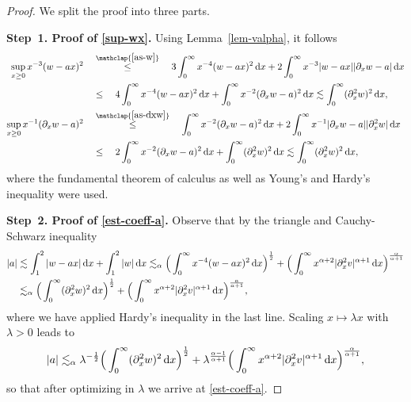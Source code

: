 \documentclass[reqno,12pt]{amsart}
\renewcommand{\d}{\ensuremath{\mathrm{d}}}
\renewcommand{\d}{\ensuremath{{\rm d}}}
\numberwithin{equation}{section}
\begin{document}
%
\begin{proof}
We split the proof into three parts.

%
\bigskip
%

\noindent\textbf{Step~1. Proof of \eqref{sup-wx}.}
Using Lemma~\ref{lem-valpha}, it follows
%
\begin{align*}
\sup_{x \ge 0} x^{-3} (w-ax)^2 \quad &\stackrel{\mathclap{\eqref{as-w}}}{\le} \quad 3 \int_0^\infty x^{-4} (w-ax)^2 \, \d x + 2 \int_0^\infty x^{-3} |w-ax| |\partial_x w - a| \, \d x \\
&\le \quad 4 \int_0^\infty x^{-4} (w-ax)^2 \, \d x + \int_0^\infty x^{-2} (\partial_x w - a)^2 \, \d x \lesssim \int_0^\infty (\partial_x^2 w)^2 \, \d x, \\
\sup_{x \ge 0} x^{-1} (\partial_x w - a)^2 \quad &\stackrel{\mathclap{\eqref{as-dxw}}}{\le} \quad \int_0^\infty x^{-2} (\partial_x w - a)^2 \, \d x + 2 \int_0^\infty x^{-1} |\partial_x w - a| |\partial_x^2 w| \, \d x \\
&\le \quad 2 \int_0^\infty x^{-2} (\partial_x w - a)^2 \, \d x + \int_0^\infty (\partial_x^2 w)^2 \, \d x \lesssim \int_0^\infty (\partial_x^2 w)^2 \, \d x,
\end{align*}
%
where the fundamental theorem of calculus as well as Young's and Hardy's inequality were used.

%
\bigskip
%

\noindent\textbf{Step~2. Proof of \eqref{est-coeff-a}.}
Observe that by the triangle and Cauchy-Schwarz inequality
%
\begin{align*}
|a| &\lesssim \int_1^2 |w - a x| \, \d x + \int_1^2 |w| \, \d x \lesssim_{\alpha}  \Big(\int_0^\infty x^{-4} (w-ax)^2 \, \d x\Big)^{\frac 1 2} + \Big(\int_0^\infty x^{\alpha+2} |\partial_x^2 v|^{\alpha+1} \, \d x\Big)^{\frac{\alpha}{\alpha+1}} \\
&\lesssim_{\alpha}  \Big(\int_0^\infty (\partial_x^2 w)^2 \, \d x\Big)^{\frac 1 2} + \Big(\int_0^\infty x^{\alpha+2} |\partial_x^2 v|^{\alpha+1} \, \d x\Big)^{\frac{\alpha}{\alpha+1}},
\end{align*}
%
where we have applied Hardy's inequality in the last line. Scaling $x \mapsto \lambda x$ with $\lambda > 0$ leads to
%
\[
|a| \lesssim_\alpha \lambda^{-\frac 1 2} \Big(\int_0^\infty (\partial_x^2 w)^2 \, \d x\Big)^{\frac 1 2} + \lambda^{\frac{\alpha-1}{\alpha+1}} \Big(\int_0^\infty x^{\alpha+2} |\partial_x^2 v|^{\alpha+1} \, \d x\Big)^{\frac{\alpha}{\alpha+1}},
\]
%
so that after optimizing in $\lambda$ we arrive at \eqref{est-coeff-a}.


\end{proof}
\end{document}
